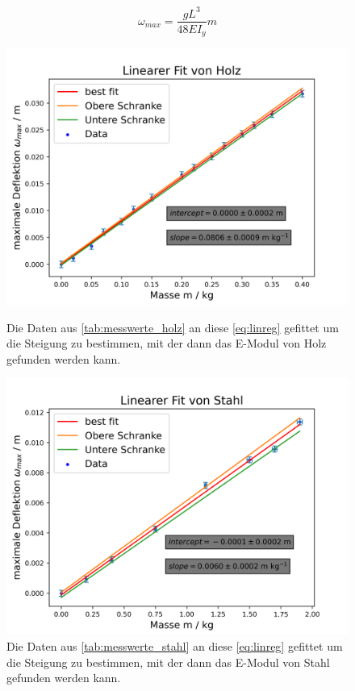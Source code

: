 \documentclass[11pt,ngerman]{scrartcl}
\begin{document}
\begin{equation}
	\omega_{max} = \frac{g L^3}{48 E I_y} m  \label{eq:linreg}
\end{equation}


\begin{figure}[H]
	\centering
	\begin{minipage}[htbp]{\linewidth}
		\begin{minipage}[htbp]{.48\linewidth} %
			\includegraphics[width=\linewidth]{pics/fit/lin_reg_m_w_messreihe_1.png}
			\caption[Linearer-Fit Holz]{Die Daten aus \autoref{tab:messwerte_holz}
				an diese \autoref{eq:linreg} gefittet um die Steigung zu bestimmen, mit der dann das E-Modul von Holz gefunden werden kann.}
			\label{fig:linregholz}
		\end{minipage}
		\begin{minipage}[htbp]{.48\linewidth} %
			\includegraphics[width=\linewidth]{pics/fit/lin_reg_m_w_messreihe_2.png}
			\caption[Linearer-Fit Stahl]{Die Daten aus \autoref{tab:messwerte_stahl}
				an diese \autoref{eq:linreg} gefittet um die Steigung zu bestimmen,
				mit der dann das E-Modul von Stahl gefunden werden kann. }
			\label{fig:linregstahl}
		\end{minipage}
	\end{minipage}
\end{figure}
\end{document}
